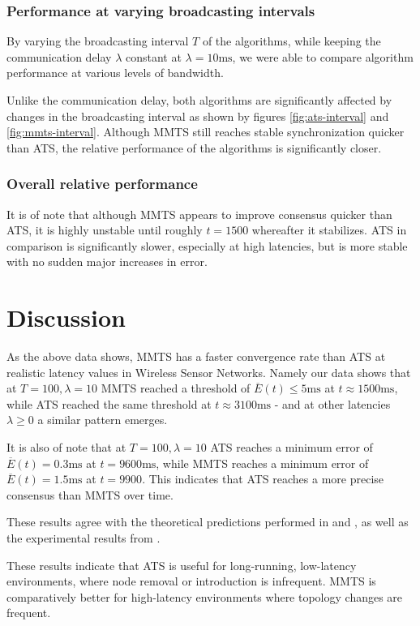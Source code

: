 \documentclass[a4paper,12pt]{article}
\begin{document}
\subsubsection{Performance at varying broadcasting intervals}
By varying the broadcasting interval $T$ of the algorithms, while keeping the communication delay $\lambda$ constant at $\lambda = 10 \text{ms}$, we were able to compare algorithm performance at various levels of bandwidth.

Unlike the communication delay, both algorithms are significantly affected by changes in the broadcasting interval as shown by figures \ref{fig:ats-interval} and \ref{fig:mmts-interval}. Although MMTS still reaches stable synchronization quicker than ATS, the relative performance of the algorithms is significantly closer.

\subsubsection{Overall relative performance}
It is of note that although MMTS appears to improve consensus quicker than ATS, it is highly unstable until roughly $t = 1500$ whereafter it stabilizes. ATS in comparison is significantly slower, especially at high latencies, but is more stable with no sudden major increases in error.

\section{Discussion}
As the above data shows, MMTS has a faster convergence rate than ATS at realistic latency values in Wireless Sensor Networks. Namely our data shows that at $T = 100, \lambda = 10$ MMTS reached a threshold of $\overline{E}(t) \leq 5\text{ms}$ at $t \approx 1500\text{ms}$, while ATS reached the same threshold at $t \approx 3100\text{ms}$ - and at other latencies $\lambda \geq 0$ a similar pattern emerges.

It is also of note that at $T = 100, \lambda = 10$ ATS reaches a minimum error of $\overline{E}(t) = 0.3\text{ms}$ at $t = 9600\text{ms}$, while MMTS reaches a minimum error of $\overline{E}(t) = 1.5\text{ms}$ at $t = 9900$. This indicates that ATS reaches a more precise consensus than MMTS over time.

These results agree with the theoretical predictions performed in \cite{LucaFiorentin11} and \cite{HeLiChenCheng13}, as well as the experimental results from \cite{HeLiChenCheng13}.

These results indicate that ATS is useful for long-running, low-latency environments, where node removal or introduction is infrequent. MMTS is comparatively better for high-latency environments where topology changes are frequent.
\end{document}

